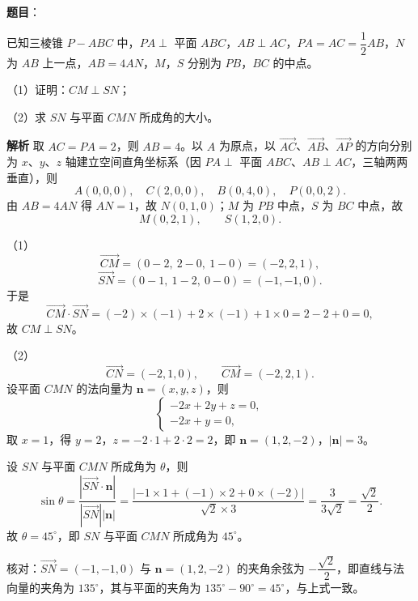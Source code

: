 \begin{answer}

\textbf{题目}：

已知三棱锥 $P-ABC$ 中，$PA\perp$ 平面 $ABC$，$AB\perp AC$，$PA=AC=\dfrac12AB$，$N$ 为 $AB$ 上一点，$AB=4AN$，$M$，$S$ 分别为 $PB$，$BC$ 的中点。

（1）证明：$CM\perp SN$；

（2）求 $SN$ 与平面 $CMN$ 所成角的大小。
\nopagebreak[4]
\begin{center}\end{center}
\nopagebreak[4]
\textbf{解析}
取 $AC=PA=2$，则 $AB=4$。以 $A$ 为原点，以 $\overrightarrow{AC}$、$\overrightarrow{AB}$、$\overrightarrow{AP}$ 的方向分别为 $x$、$y$、$z$ 轴建立空间直角坐标系（因 $PA\perp$ 平面 $ABC$、$AB\perp AC$，三轴两两垂直），则
\nopagebreak[4]
\[A(0,0,0),\quad C(2,0,0),\quad B(0,4,0),\quad P(0,0,2).\]
由 $AB=4AN$ 得 $AN=1$，故 $N(0,1,0)$；$M$ 为 $PB$ 中点，$S$ 为 $BC$ 中点，故
\nopagebreak[4]
\[M(0,2,1),\qquad S(1,2,0).\]

（1）
\nopagebreak[4]
\[\overrightarrow{CM}=(0-2,\ 2-0,\ 1-0)=(-2,2,1),\]
\nopagebreak[4]
\[\overrightarrow{SN}=(0-1,\ 1-2,\ 0-0)=(-1,-1,0).\]
于是
\nopagebreak[4]
\[\overrightarrow{CM}\cdot\overrightarrow{SN}=(-2)\times(-1)+2\times(-1)+1\times0=2-2+0=0,\]
故 $CM\perp SN$。

（2）
\nopagebreak[4]
\[\overrightarrow{CN}=(-2,1,0),\qquad \overrightarrow{CM}=(-2,2,1).\]
设平面 $CMN$ 的法向量为 $\boldsymbol n=(x,y,z)$，则
\nopagebreak[4]
\[\begin{cases}-2x+2y+z=0,\\-2x+y=0,\end{cases}\]
取 $x=1$，得 $y=2$，$z=-2\cdot1+2\cdot2=2$，即 $\boldsymbol n=(1,2,-2)$，$|\boldsymbol n|=3$。

设 $SN$ 与平面 $CMN$ 所成角为 $\theta$，则
\nopagebreak[4]
\[\sin\theta=\frac{\left|\overrightarrow{SN}\cdot\boldsymbol n\right|}{\left|\overrightarrow{SN}\right|\left|\boldsymbol n\right|}
=\frac{\left|-1\times1+(-1)\times2+0\times(-2)\right|}{\sqrt2\times3}
=\frac{3}{3\sqrt2}=\frac{\sqrt2}{2}.\]
故 $\theta=45^\circ$，即 $SN$ 与平面 $CMN$ 所成角为 $45^\circ$。

核对：$\overrightarrow{SN}=(-1,-1,0)$ 与 $\boldsymbol n=(1,2,-2)$ 的夹角余弦为 $-\dfrac{\sqrt2}{2}$，即直线与法向量的夹角为 $135^\circ$，其与平面的夹角为 $135^\circ-90^\circ=45^\circ$，与上式一致。


\end{answer}
